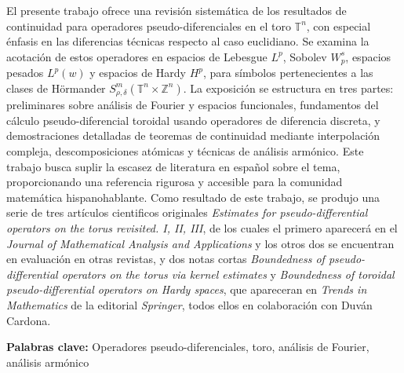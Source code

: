 
		El presente trabajo ofrece una revisión sistemática de los resultados de continuidad para operadores pseudo-diferenciales en el toro $\mathbb{T}^n$, con especial énfasis en las diferencias técnicas respecto al caso euclidiano. Se examina la acotación de estos operadores en espacios de Lebesgue $L^p$, Sobolev $W^s_p$, espacios pesados $L^p(w)$ y espacios de Hardy $H^p$, para símbolos pertenecientes a las clases de Hörmander $S^m_{\rho,\delta}(\mathbb{T}^n \times \mathbb{Z}^n)$. La exposición se estructura en tres partes: preliminares sobre análisis de Fourier y espacios funcionales, fundamentos del cálculo pseudo-diferencial toroidal usando operadores de diferencia discreta, y demostraciones detalladas de teoremas de continuidad mediante interpolación compleja, descomposiciones atómicas y técnicas de análisis armónico. Este trabajo busca suplir la escasez de literatura en español sobre el tema, proporcionando una referencia rigurosa y accesible para la comunidad matemática hispanohablante. Como resultado de este trabajo, se produjo una serie de tres artículos cientificos originales \textit{Estimates for pseudo-differential operators on the torus revisited. I, II, III}, de los cuales el primero aparecerá en el \textit{Journal of Mathematical Analysis and Applications} y los otros dos se encuentran en evaluación en otras revistas, y dos notas cortas \textit{Boundedness of pseudo-differential operators on the torus via kernel estimates} y \textit{Boundedness of toroidal pseudo-differential operators on Hardy spaces}, que apareceran en \textit{Trends in Mathematics} de la editorial \textit{Springer}, todos ellos en colaboración con Duván Cardona.
		
		\textbf{Palabras clave:} Operadores pseudo-diferenciales, toro, análisis de Fourier, análisis armónico

